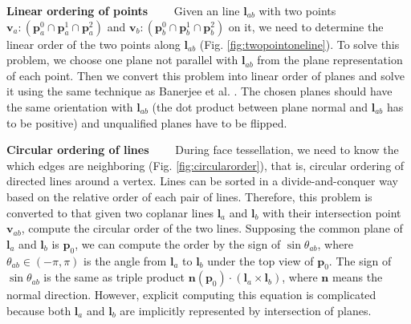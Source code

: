 \documentclass[10pt,journal,compsoc]{IEEEtran}
\begin{document}
\vspace{0.5em}
\noindent \textbf{Linear ordering of points}~~~~
Given an line $\bm{l}_{ab}$ with two points $\bm{v}_a\colon(\bm{p}_a^0\cap\bm{p}_a^1\cap\bm{p}_a^2)$ and $\bm{v}_b\colon(\bm{p}_b^0\cap\bm{p}_b^1\cap\bm{p}_b^2)$ on it, we need to determine the linear order of the two points along $\bm{l}_{ab}$ (Fig. \ref{fig:twopointoneline}). To solve this problem, we choose one plane not parallel with $\bm{l}_{ab}$ from the plane representation of each point. Then we convert this problem into linear order of planes and solve it using the same technique as Banerjee et al. \cite{banerjee1996topologically}. The chosen planes should have the same orientation with $\bm{l}_{ab}$ (the dot product between plane normal and $\bm{l}_{ab}$ has to be positive) and unqualified planes have to be flipped.


\vspace{0.5em}
\noindent \textbf{Circular ordering of lines}~~~~
During face tessellation, we need to know the which edges are neighboring (Fig. \ref{fig:circularorder}), that is, circular ordering of directed lines around a vertex. Lines can be sorted in a divide-and-conquer way based on the relative order of each pair of lines. Therefore, this problem is converted to that given two coplanar lines $\bm{l}_a$ and $\bm{l}_b$ with their intersection point $\bm{v}_{ab}$, compute the circular order of the two lines. Supposing the common plane of $\bm{l}_a$ and $\bm{l}_b$ is $\bm{p}_0$, we can compute the order by the sign of $\sin{\theta_{ab}}$, where $\theta_{ab}\in(-\pi,\pi)$ is the angle from $\bm{l}_a$ to $\bm{l}_b$ under the top view of $\bm{p}_0$. The sign of $\sin{\theta_{ab}}$ is the same as triple product $\bm{n}(\bm{p}_0) \cdot (\bm{l}_a\times\bm{l}_b)$,
where $\bm{n}$ means the normal direction. However, explicit computing this equation is complicated because both $\bm{l}_a$ and $\bm{l}_b$ are implicitly represented by intersection of planes.
\end{document}
